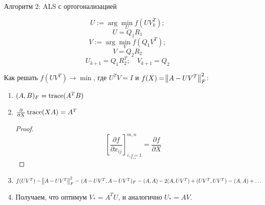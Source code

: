 Алгоритм 2: ALS с ортогонализацией

\[
    U := \arg\min_{U} f(U V_k^T);
\]
\[
    U = Q_1 R_1
\]
\[
    V := \arg\min_{V} f(Q_1 V^T);
\]
\[
    V = Q_2 R_2
\]
\[
    U_{k + 1} = Q_1 R_2^T; \quad V_{k + 1} = Q_2
\]

Как решать $f(U V^T) \to \min$, где $U^T V = I$ и $f(X) = \norm{A - U V^T}_F^2$:

\begin{enumerate}
    \item $(A, B)_F = \operatorname{trace}(A^T B)$
    \item $\frac{\partial}{\partial X} \operatorname{trace}(X A) = A^T$
        \begin{proof}
            \[
                \left[ \frac{\partial f}{\partial x_{ij}} \right]_{i,j=1}^{m,n}
                = \frac{\partial f}{\partial X}
            \]
            \[
                \dots
            \]
        \end{proof}
    \item $f(U V^T) = \norm{A - U V^T}_F^2 = (A - U V^T, A - U V^T)_F
        = (A, A) - 2 (A, U V^T) + (U V^T, U V^T) = (A, A) + \dots$
    \item Получаем, что оптимум $V_* = A^T U$, и аналогично $U_* = A V$.
\end{enumerate}
